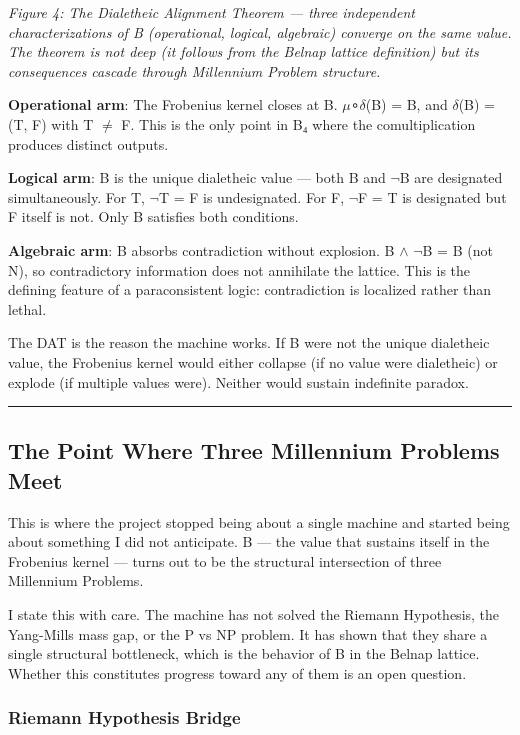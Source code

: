 \documentclass[12pt,a4paper]{article}
\begin{document}
\emph{Figure 4: The Dialetheic Alignment Theorem --- three independent characterizations of B (operational, logical, algebraic) converge on the same value. The theorem is not deep (it follows from the Belnap lattice definition) but its consequences cascade through Millennium Problem structure.}

\textbf{Operational arm}: The Frobenius kernel closes at B. $\mu$∘$\delta$(B) = B, and $\delta$(B) = (T, F) with T $\neq$ F. This is the only point in B₄ where the comultiplication produces distinct outputs.

\textbf{Logical arm}: B is the unique dialetheic value --- both B and $\neg$B are designated simultaneously. For T, $\neg$T = F is undesignated. For F, $\neg$F = T is designated but F itself is not. Only B satisfies both conditions.

\textbf{Algebraic arm}: B absorbs contradiction without explosion. B $\land$ $\neg$B = B (not N), so contradictory information does not annihilate the lattice. This is the defining feature of a paraconsistent logic: contradiction is localized rather than lethal.

The DAT is the reason the machine works. If B were not the unique dialetheic value, the Frobenius kernel would either collapse (if no value were dialetheic) or explode (if multiple values were). Neither would sustain indefinite paradox.

\begin{center}
\rule{0.5\textwidth}{0.4pt}
\end{center}

\subsection{The Point Where Three Millennium Problems Meet}

This is where the project stopped being about a single machine and started being about something I did not anticipate. B --- the value that sustains itself in the Frobenius kernel --- turns out to be the structural intersection of three Millennium Problems.

I state this with care. The machine has not solved the Riemann Hypothesis, the Yang-Mills mass gap, or the P vs NP problem. It has shown that they share a single structural bottleneck, which is the behavior of B in the Belnap lattice. Whether this constitutes progress toward any of them is an open question.

\subsubsection{Riemann Hypothesis Bridge}
\end{document}
